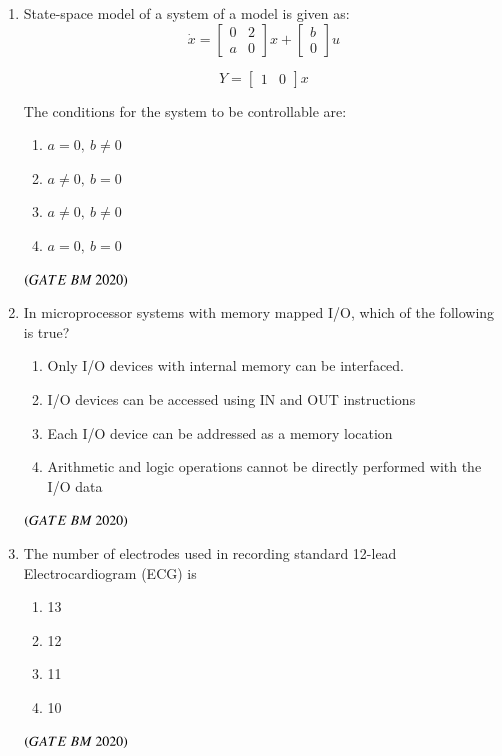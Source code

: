 \documentclass[journal,12pt,onecolumn]{IEEEtran}
\theoremstyle{remark}
\begin{document}
\begin{enumerate}
\item State-space model of a system of a model is given as:
\[
\dot{x} = \begin{bmatrix} 0 & 2 \\ a & 0 \end{bmatrix} x + \begin{bmatrix} b \\ 0 \end{bmatrix} u
\]

\[
Y = \begin{bmatrix} 1 & 0 \end{bmatrix} x
\]

The conditions for the system to be controllable are:

\begin{enumerate}[label=(\Alph*)]
    \item\hspace{0.5cm} $a = 0,\ b \ne 0$
    \item\hspace{0.5cm} $a \ne 0,\ b = 0$
    \item\hspace{0.5cm} $a \ne 0,\ b \ne 0$
    \item\hspace{0.5cm} $a = 0,\ b = 0$
\end{enumerate}
 \hfill $\left(GATE\ BM\ 2020\right)$

\item In microprocessor systems with memory mapped I/O, which of the following is true?
\begin{enumerate}[label=\alph*)] 
\item\hspace{0.5cm}Only I/O devices with internal memory can be interfaced.
\item\hspace{0.5cm}I/O devices can be accessed using IN and OUT instructions
\item\hspace{0.5cm}Each I/O device can be addressed as a memory location
\item\hspace{0.5cm}Arithmetic and logic operations cannot be directly performed with the I/O data
\end{enumerate}
 \hfill $\left(GATE\ BM\ 2020\right)$
 
\item The number of electrodes used in recording standard 12-lead Electrocardiogram (ECG) is
\begin{enumerate}[label=\alph*)] 
\item\hspace{0.5cm}13
\item\hspace{0.5cm}12
\item\hspace{0.5cm}11
\item\hspace{0.5cm}10
\end{enumerate}
 \hfill $\left(GATE\ BM\ 2020\right)$
 

\end{enumerate}
\end{document}

